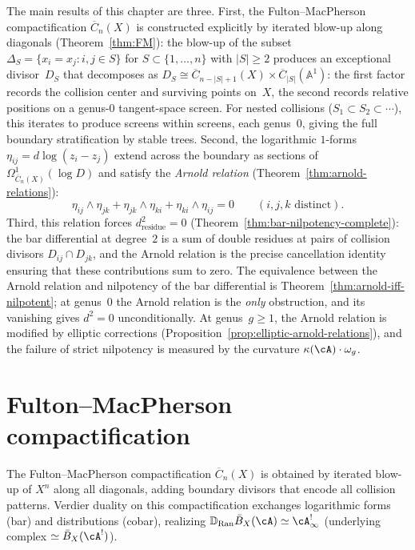 The main results of this chapter are three.  First, the
Fulton--MacPherson compactification $\overline{C}_n(X)$ is
constructed explicitly by iterated blow-up along diagonals
(Theorem~\ref{thm:FM}): the blow-up of the
subset $\Delta_S = \{x_i = x_j : i,j \in S\}$ for
$S \subset \{1,\ldots,n\}$ with $|S| \geq 2$ produces an
exceptional divisor~$D_S$ that decomposes as
$D_S \cong \overline{C}_{n-|S|+1}(X)
\times \overline{C}_{|S|}(\mathbb{A}^1)$:
the first factor records the collision center and surviving
points on~$X$, the second records relative positions on a
genus-$0$ tangent-space screen.  For nested collisions
($S_1 \subset S_2 \subset \cdots$), this iterates to produce
screens within screens, each genus~$0$, giving the full boundary
stratification by stable trees.  Second, the logarithmic
$1$-forms $\eta_{ij} = d\log(z_i - z_j)$ extend across the
boundary as sections of
$\Omega^1_{\overline{C}_n(X)}(\log D)$ and satisfy the
\emph{Arnold relation}
(Theorem~\ref{thm:arnold-relations}):
\begin{equation}\tag{$\star$}
\eta_{ij} \wedge \eta_{jk}
+ \eta_{jk} \wedge \eta_{ki}
+ \eta_{ki} \wedge \eta_{ij} = 0
\qquad (i,j,k \text{ distinct}).
\end{equation}
Third, this relation forces $d_{\mathrm{residue}}^2 = 0$
(Theorem~\ref{thm:bar-nilpotency-complete}): the
bar differential at degree~$2$ is a sum of double residues
at pairs of collision divisors $D_{ij} \cap D_{jk}$, and
the Arnold relation is the precise cancellation identity
ensuring that these contributions sum to zero.  The
equivalence between the Arnold relation and nilpotency of
the bar differential is
Theorem~\ref{thm:arnold-iff-nilpotent}; at genus~$0$ the
Arnold relation is the \emph{only} obstruction, and its
vanishing gives $d^2 = 0$ unconditionally.  At
genus~$g \geq 1$, the Arnold relation is modified by
elliptic corrections
(Proposition~\ref{prop:elliptic-arnold-relations}), and
the failure of strict nilpotency is measured by the
curvature $\kappa(\cA) \cdot \omega_g$.

\section{Fulton--MacPherson compactification}
\label{sec:FM-compactification}

The Fulton--MacPherson compactification $\overline{C}_n(X)$ is obtained by iterated blow-up of $X^n$ along all diagonals, adding boundary divisors that encode all collision patterns.  Verdier duality on this compactification exchanges logarithmic forms
(bar) and distributions (cobar), realizing
$\mathbb{D}_{\operatorname{Ran}} \bar{B}_X(\cA) \simeq
\cA^!_\infty$ (underlying complex $\simeq \bar{B}_X(\cA^!)$).

